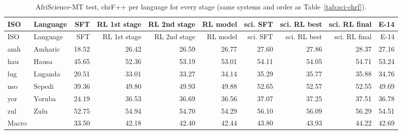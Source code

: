 {\scriptsize\setlength{\tabcolsep}{1.5pt}
\begin{longtable}{@{}llrrrrrrrr@{}}
\caption{AfriScience-MT test, chrF++ per language for every stage (same systems and order as Table~\ref{tab:sci-chrf}).}\label{tab:sci-chrfpp}\\
\toprule
ISO & Language & SFT & RL 1st stage & RL 2nd stage & RL model & sci. SFT & sci. RL best & sci. RL final & E-14 \\
\midrule\endfirsthead
\toprule
ISO & Language & SFT & RL 1st stage & RL 2nd stage & RL model & sci. SFT & sci. RL best & sci. RL final & E-14 \\
\midrule\endhead
\midrule\endfoot
\bottomrule\endlastfoot
amh & Amharic & 18.52 & 26.42 & 26.59 & 26.77 & 27.60 & 27.86 & 28.37 & 27.16 \\
hau & Hausa & 45.65 & 52.36 & 53.19 & 53.01 & 54.11 & 54.05 & 54.71 & 53.24 \\
lug & Luganda & 20.51 & 33.01 & 33.27 & 34.14 & 35.29 & 35.77 & 35.88 & 34.76 \\
nso & Sepedi & 39.36 & 49.80 & 49.93 & 49.88 & 52.65 & 52.57 & 52.55 & 49.69 \\
yor & Yoruba & 24.19 & 36.53 & 36.69 & 36.56 & 37.07 & 37.25 & 37.51 & 36.78 \\
zul & Zulu & 52.75 & 54.94 & 54.70 & 54.29 & 56.10 & 56.09 & 56.29 & 54.51 \\
\midrule Macro &  & 33.50 & 42.18 & 42.40 & 42.44 & 43.80 & 43.93 & 44.22 & 42.69 \\
\end{longtable}}
